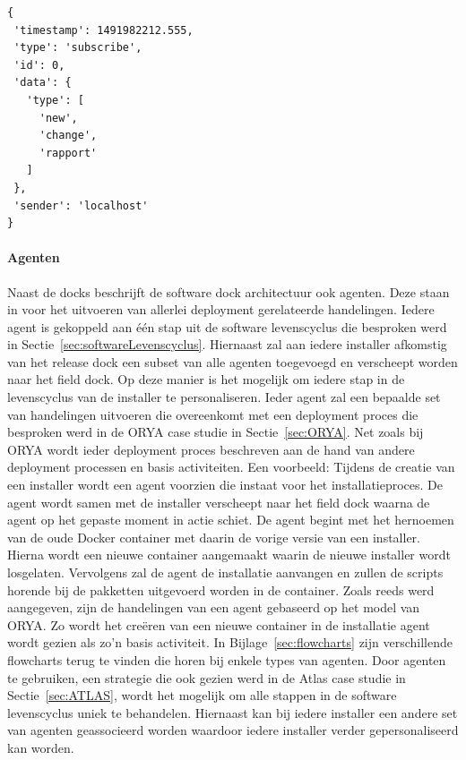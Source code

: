 \begin{minipage}{\linewidth}
\begin{center}
\begin{lstlisting}[caption={Format voor een bericht},label={list:bericht}, xleftmargin=.3\textwidth]
{
 'timestamp': 1491982212.555,
 'type': 'subscribe',
 'id': 0,
 'data': {
   'type': [
     'new',
     'change',
     'rapport'
   ]
 },
 'sender': 'localhost'
}
\end{lstlisting}
\end{center}
\end{minipage}

\paragraph{Agenten}
Naast de docks beschrijft de software dock architectuur ook agenten.
Deze staan in voor het uitvoeren van allerlei deployment gerelateerde handelingen.
Iedere agent is gekoppeld aan één stap uit de software levenscyclus die besproken werd in Sectie~\vref{sec:softwareLevenscyclus}.
Hiernaast zal aan iedere installer afkomstig van het release dock een subset van alle agenten toegevoegd en verscheept worden naar het field dock.
Op deze manier is het mogelijk om iedere stap in de levenscyclus van de installer te personaliseren.
Ieder agent zal een bepaalde set van handelingen uitvoeren die overeenkomt met een deployment proces die besproken werd in de ORYA case studie in Sectie~\vref{sec:ORYA}.
Net zoals bij ORYA wordt ieder deployment proces beschreven aan de hand van andere deployment processen en basis activiteiten.
Een voorbeeld:
Tijdens de creatie van een installer wordt een agent voorzien die instaat voor het installatieproces.
De agent wordt samen met de installer verscheept naar het field dock waarna de agent op het gepaste moment in actie schiet.
De agent begint met het hernoemen van de oude Docker container met daarin de vorige versie van een installer.
Hierna wordt een nieuwe container aangemaakt waarin de nieuwe installer wordt losgelaten.
Vervolgens zal de agent de installatie aanvangen en zullen de scripts horende bij de pakketten uitgevoerd worden in de container.
Zoals reeds werd aangegeven, zijn de handelingen van een agent gebaseerd op het model van ORYA.
Zo wordt het creëren van een nieuwe container in de installatie agent wordt gezien als zo'n basis activiteit.
In Bijlage~\vref{sec:flowcharts} zijn verschillende flowcharts terug te vinden die horen bij enkele types van agenten.
Door agenten te gebruiken, een strategie die ook gezien werd in de Atlas case studie in Sectie~\vref{sec:ATLAS}, wordt het mogelijk om alle stappen in de software levenscyclus uniek te behandelen.
Hiernaast kan bij iedere installer een andere set van agenten geassocieerd worden waardoor iedere installer verder gepersonaliseerd kan worden.

